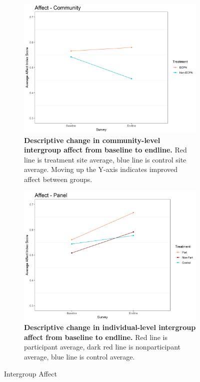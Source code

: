\documentclass[11pt]{article}
\begin{document}
\begin{figure}[H]
    \begin{subfigure}[b]{.48\textwidth}
    \centering
        \includegraphics[width=\linewidth]{../../../figs/affectComm_plot.png}
        \caption{\textbf{Descriptive change in community-level intergroup affect from baseline to endline.} Red line is treatment site average, blue line is control site average.  Moving up the Y-axis indicates improved affect between groups.}
        \label{fig:fig3}
    \end{subfigure}
    \hfill
    \begin{subfigure}[b]{.48\textwidth}
    \centering
        \includegraphics[width=\linewidth]{../../../figs/affectPan_plot.png}
        \caption{\textbf{Descriptive change in individual-level intergroup affect from baseline to endline.} Red line is participant average, dark red line is nonparticipant average, blue line is control average.}
        \label{fig:fig4}
    \end{subfigure}
\caption{Intergroup Affect}
\end{figure}
\end{document}
